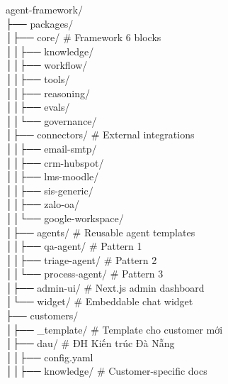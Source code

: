 \documentclass[11pt,a4paper]{article}
\begin{document}
\begin{tcolorbox}[enhanced, colback=codebg, colframe=leaf!40, boxrule=0.5pt,
left=8pt, right=8pt, top=5pt, bottom=5pt, arc=1pt]
\ttfamily\footnotesize
agent-framework/\\
├── packages/\\
│\phantom{xx}├── core/                  \# Framework 6 blocks\\
│\phantom{xx}│\phantom{xx}├── knowledge/\\
│\phantom{xx}│\phantom{xx}├── workflow/\\
│\phantom{xx}│\phantom{xx}├── tools/\\
│\phantom{xx}│\phantom{xx}├── reasoning/\\
│\phantom{xx}│\phantom{xx}├── evals/\\
│\phantom{xx}│\phantom{xx}└── governance/\\
│\phantom{xx}├── connectors/            \# External integrations\\
│\phantom{xx}│\phantom{xx}├── email-smtp/\\
│\phantom{xx}│\phantom{xx}├── crm-hubspot/\\
│\phantom{xx}│\phantom{xx}├── lms-moodle/\\
│\phantom{xx}│\phantom{xx}├── sis-generic/\\
│\phantom{xx}│\phantom{xx}├── zalo-oa/\\
│\phantom{xx}│\phantom{xx}└── google-workspace/\\
│\phantom{xx}├── agents/                \# Reusable agent templates\\
│\phantom{xx}│\phantom{xx}├── qa-agent/            \# Pattern 1\\
│\phantom{xx}│\phantom{xx}├── triage-agent/        \# Pattern 2\\
│\phantom{xx}│\phantom{xx}└── process-agent/       \# Pattern 3\\
│\phantom{xx}├── admin-ui/              \# Next.js admin dashboard\\
│\phantom{xx}└── widget/                \# Embeddable chat widget\\
├── customers/\\
│\phantom{xx}├── \_template/             \# Template cho customer mới\\
│\phantom{xx}├── dau/                   \# ĐH Kiến trúc Đà Nẵng\\
│\phantom{xx}│\phantom{xx}├── config.yaml\\
│\phantom{xx}│\phantom{xx}├── knowledge/           \# Customer-specific docs\\

\end{tcolorbox}
\end{document}
